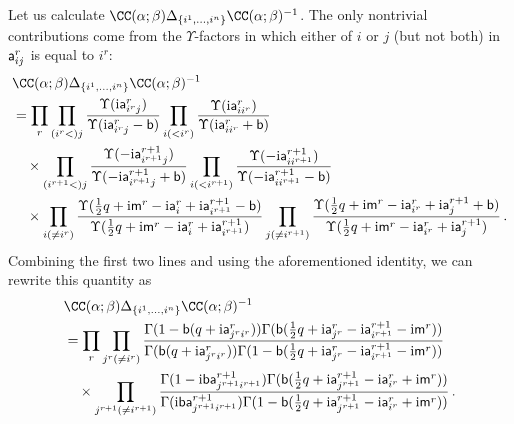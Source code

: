 Let us calculate
$\CC(\alpha; \beta) \Delta_{\{i^1,\dotsc,i^n\}} \CC(\alpha;
\beta)^{-1}$.  The only nontrivial contributions come from the
$\Upsilon$-factors in which either of $i$ or $j$ (but not both) in
$\mathsf{a}^r_{ij}$ is equal to $i^r$:
\begin{equation}
  \begin{split}
    & \CC(\alpha; \beta) \Delta_{\{i^1,\dotsc,i^n\}} \CC(\alpha; \beta)^{-1}
    \\
    &=
    \prod_r
    \prod_{(i^r<)j}
    \frac{\Upsilon(\iu \as^r_{i^r j})}{\Upsilon(\iu \as^r_{i^r j} - \bs)}
    \prod_{i(<i^r)}
    \frac{\Upsilon(\iu \as^r_{ii^r})}{\Upsilon(\iu \as^r_{ii^r} + \bs)}
    \\ & \quad
    \times
    \prod_{(i^{r+1}<)j}
    \frac{\Upsilon(-\iu \as^{r+1}_{i^{r+1} j})}
          {\Upsilon(-\iu \as^{r+1}_{i^{r+1} j} + \bs)}
    \prod_{i(<i^{r+1})}
    \frac{\Upsilon(-\iu \as^{r+1}_{ii^{r+1}})}
          {\Upsilon(-\iu \as^{r+1}_{ii^{r+1}} - \bs)}
    \\ & \quad
    \times
    \prod_{i(\neq i^r)}
    \frac{\Upsilon(\frac12 q + \iu \ms^r - \iu \as^r_{i} + \iu \as^{r+1}_{i^{r+1}} - \bs)}
          {\Upsilon(\frac12 q + \iu \ms^r - \iu \as^r_{i} + \iu \as^{r+1}_{i^{r+1}})}
    \prod_{j(\neq i^{r+1})}
    \frac{\Upsilon(\frac12 q + \iu \ms^r - \iu \as^r_{i^r} + \iu \as^{r+1}_{j} + \bs)}
          {\Upsilon(\frac12 q + \iu \ms^r - \iu \as^r_{i^r} + \iu \as^{r+1}_{j})}
  \,.
  \end{split}
\end{equation}
Combining the first two lines and using the aforementioned identity,
we can rewrite this quantity as
\begin{equation}
  \begin{split}
    &\CC(\alpha; \beta) \Delta_{\{i^1,\dotsc,i^n\}} \CC(\alpha; \beta)^{-1}
    \\
    &=
    \prod_r
    \prod_{j^r (\neq i^r)}
    \frac{\Gamma(1 - \bs(q + \iu \as^r_{j^r i^r}))
        \Gamma(\bs(\frac12 q + \iu \as^r_{j^r} - \iu \as^{r+1}_{i^{r+1}} - \iu \ms^r))}
      {\Gamma(\bs(q + \iu \as^r_{j^r i^r}))
        \Gamma(1 - \bs(\frac12 q + \iu \as^r_{j^r} - \iu \as^{r+1}_{i^{r+1}} - \iu \ms^r))}
    \\
    & \quad
    \times
    \prod_{j^{r+1}(\neq i^{r+1})}
    \frac{\Gamma(1 - \iu\bs \as^{r+1}_{j^{r+1} i^{r+1}})
      \Gamma(\bs(\frac12 q + \iu \as^{r+1}_{j^{r+1}} - \iu \as^r_{i^r} + \iu \ms^r))}
    {\Gamma(\iu\bs\as^{r+1}_{j^{r+1} i^{r+1}})
      \Gamma(1 - \bs(\frac12 q + \iu \as^{r+1}_{j^{r+1}} - \iu \as^r_{i^r} + \iu \ms^r))}
    \,.
  \end{split}
\end{equation}
